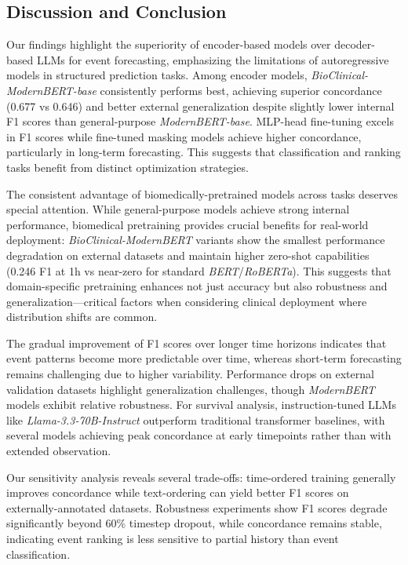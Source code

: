 \subsection{Discussion and Conclusion}

Our findings highlight the superiority of encoder-based models over decoder-based LLMs for event forecasting, emphasizing the limitations of autoregressive models in structured prediction tasks.
Among encoder models, \textit{BioClinical-ModernBERT-base} consistently performs best, achieving superior concordance (0.677 vs 0.646) and better external generalization despite slightly lower internal F1 scores than general-purpose \textit{ModernBERT-base}.
MLP-head fine-tuning excels in F1 scores while fine-tuned masking models achieve higher concordance, particularly in long-term forecasting.
This suggests that classification and ranking tasks benefit from distinct optimization strategies.

The consistent advantage of biomedically-pretrained models across tasks deserves special attention.
While general-purpose models achieve strong internal performance, biomedical pretraining provides crucial benefits for real-world deployment: \textit{BioClinical-ModernBERT} variants show the smallest performance degradation on external datasets and maintain higher zero-shot capabilities (0.246 F1 at 1h vs near-zero for standard \textit{BERT}/\textit{RoBERTa}).
This suggests that domain-specific pretraining enhances not just accuracy but also robustness and generalization—critical factors when considering clinical deployment where distribution shifts are common.

The gradual improvement of F1 scores over longer time horizons indicates that event patterns become more predictable over time, whereas short-term forecasting remains challenging due to higher variability.
Performance drops on external validation datasets highlight generalization challenges, though \textit{ModernBERT} models exhibit relative robustness.
For survival analysis, instruction-tuned LLMs like \textit{Llama-3.3-70B-Instruct} outperform traditional transformer baselines, with several models achieving peak concordance at early timepoints rather than with extended observation.

Our sensitivity analysis reveals several trade-offs: time-ordered training generally improves concordance while text-ordering can yield better F1 scores on externally-annotated datasets.
Robustness experiments show F1 scores degrade significantly beyond 60\% timestep dropout, while concordance remains stable, indicating event ranking is less sensitive to partial history than event classification. 

